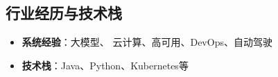\documentclass[letterpaper,11pt]{article}
\newcommand{\resumeItem}[2]{
	\item\small{
		\textbf{#1}{: #2 \vspace{-2pt}}
	}
}
\newcommand{\resumeSubItem}[2]{\resumeItem{#1}{#2}\vspace{-4pt}}
\newcommand{\resumeSubHeadingListStart}{\begin{itemize}[leftmargin=*]}
\newcommand{\resumeSubHeadingListEnd}{\end{itemize}}
\begin{document}
\begin{spacing}{0.94}
		
		
		
		\section{行业经历与技术栈}
		\resumeSubHeadingListStart
		\item{
			\textbf{系统经验}{：大模型、 云计算、高可用、DevOps、自动驾驶}
			\hfill
		}
		\item{
			\textbf{技术栈}{：Java、Python、Kubernetes等}
			\hfill
		}
		\resumeSubHeadingListEnd
		
	\end{spacing}
\end{document}
